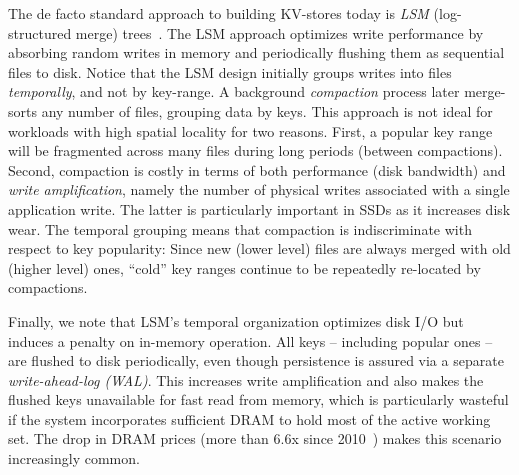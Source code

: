 The de facto standard approach to building KV-stores today is \emph{LSM} (log-structured merge) trees~\cite{DBLP:journals/acta/ONeilCGO96}. 
The LSM approach optimizes write performance by absorbing random writes in memory and periodically flushing 
them as sequential files to disk. %
Notice that the LSM design initially groups writes  into files \emph{temporally}, and not by key-range. 
A background \emph{compaction} process later merge-sorts any number of files, grouping data by keys. 
This approach is not ideal for workloads with high spatial locality for two reasons. 
First, a popular key range will be fragmented across many files during long periods (between compactions). 
Second,  compaction  is costly in terms of  both performance 
(disk bandwidth) and \emph{write amplification}, namely the number of physical writes 
associated with a single application write. The latter is  particularly important in SSDs as it increases disk wear. 
The temporal grouping means that compaction is indiscriminate with respect to key popularity:  
Since new (lower level) files are always merged with old (higher level) ones, 
 ``cold'' key ranges
 continue to be repeatedly re-located
by  compactions.  


Finally, we note that LSM's temporal  organization optimizes disk I/O but induces a penalty on in-memory operation. 
All keys -- including popular ones -- are flushed to disk periodically, even though persistence is assured 
via a separate \emph{write-ahead-log (WAL)}.
This increases write amplification and also makes the flushed keys unavailable for fast read from memory,
which is particularly wasteful if the system incorporates sufficient DRAM to hold most of the active working set. 
The drop in DRAM prices (more than $6.6$x since 2010~\cite{dram-prices})  
makes this scenario increasingly common.  

